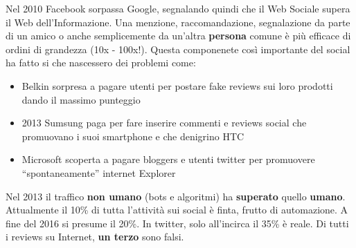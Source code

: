 Nel 2010 Facebook sorpassa Google, segnalando quindi che il Web Sociale supera il Web dell'Informazione. Una menzione, raccomandazione, segnalazione da parte di un amico o anche semplicemente da un'altra \textbf{persona} comune \`e pi\`u efficace di ordini di grandezza (10x - 100x!). Questa componenete cos\`i importante del social ha fatto si che nascessero dei problemi come:
\begin{itemize}

\item Belkin sorpresa a pagare utenti per postare fake reviews sui loro prodotti dando il massimo punteggio
\item 2013 Sumsung paga per fare inserire commenti e reviews social che promuovano i suoi smartphone e che denigrino HTC
\item Microsoft scoperta a pagare bloggers e utenti twitter per promuovere ``spontaneamente'' internet Explorer

\end{itemize}


Nel 2013 il traffico \textbf{non umano} (bots e algoritmi) ha \textbf{superato} quello \textbf{umano}. Attualmente il 10\% di tutta l'attivit\`a sui social \`e finta, frutto di automazione. A fine del 2016 si presume il 20\%. In twitter, solo all'incirca il 35\% \`e reale. Di tutti i reviews su Internet, \textbf{un terzo} sono falsi.

